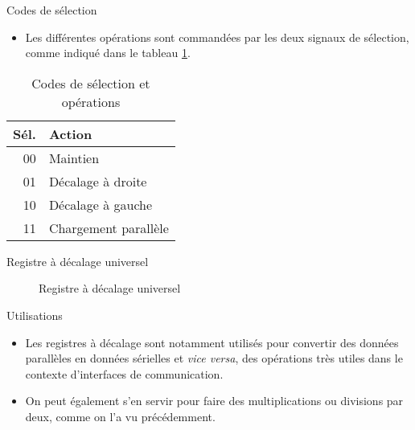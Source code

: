 \documentclass[presentation]{beamer}
\begin{document}
\begin{frame}[label={sec:orge19acfe}]{Codes de sélection}
\begin{itemize}
\item Les différentes opérations sont commandées par les deux signaux de sélection, comme indiqué dans le tableau \ref{tab:orgeef798a}.
\end{itemize}

\begin{table}[htbp]
\caption{\label{tab:orgeef798a}Codes de sélection et opérations}
\centering
\begin{tabular}{rl}
Sél. & Action\\[0pt]
\hline
00 & Maintien\\[0pt]
01 & Décalage à droite\\[0pt]
10 & Décalage à gauche\\[0pt]
11 & Chargement parallèle\\[0pt]
\end{tabular}
\end{table}
\end{frame}

\begin{frame}[label={sec:org0e9a9cf}]{Registre à décalage universel}
\begin{figure}[htbp]
\centering

\caption{\label{fig:orgfcaa1b4}Registre à décalage universel}
\end{figure} 
\end{frame}

\begin{frame}[label={sec:orgf1cdc99}]{Utilisations}
\begin{itemize}
\item Les registres à décalage sont notamment utilisés pour convertir des données parallèles en données sérielles et \emph{vice versa}, des opérations très utiles dans le contexte d'interfaces de communication.

\item On peut également s'en servir pour faire des multiplications ou divisions par deux, comme on l'a vu précédemment.
\end{itemize}
\end{frame}
\end{document}
